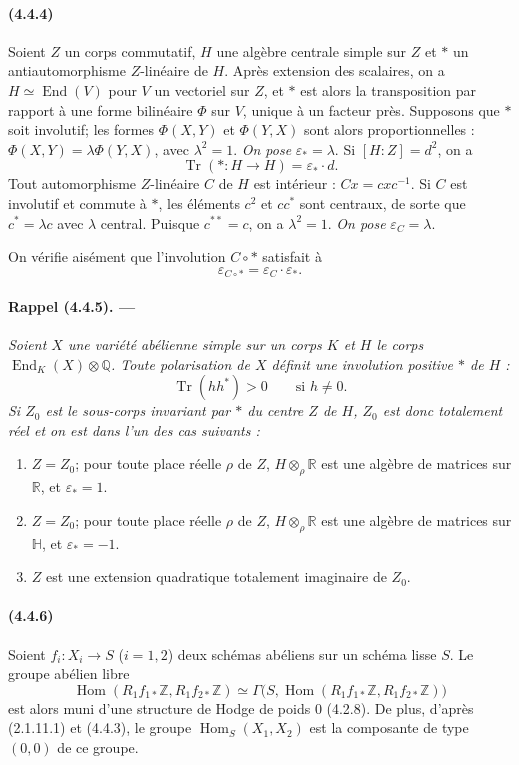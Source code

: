 \documentclass[10pt]{article}
\newcommand{\Q}{\mathbb Q}
\newcommand{\Z}{\mathbb Z}
\newcommand{\Hom}{\operatorname{Hom}}
\newcommand{\R}{\mathbb R}
\providecommand{\End}{\operatorname{End}}
\newcommand{\Tr}{\operatorname{Tr}}
\begin{document}
\paragraph{(4.4.4)} Soient $Z$ un corps commutatif, $H$ une algèbre centrale simple sur $Z$ et $*$ un antiautomorphisme $Z$-linéaire de $H$. Après extension des scalaires, on a $H\simeq\End(V)$ pour $V$ un vectoriel sur $Z$, et $*$ est alors la transposition par rapport à une forme bilinéaire $\Phi$ sur $V$, unique à un facteur près. Supposons que $*$ soit involutif; les formes $\Phi(X,Y)$ et $\Phi(Y,X)$ sont alors proportionnelles : $\Phi(X,Y)=\lambda\Phi(Y,X)$, avec $\lambda^2=1$. \emph{On pose} $\varepsilon_*=\lambda$. Si $[H:Z]=d^2$, on a
\[
\Tr(*:H\to H)=\varepsilon_*\cdot d.
\]
Tout automorphisme $Z$-linéaire $C$ de $H$ est intérieur : $Cx=cxc^{-1}$. Si $C$ est involutif et commute à $*$, les éléments $c^2$ et $cc^*$ sont centraux, de sorte que $c^*=\lambda c$ avec $\lambda$ central. Puisque $c^{**}=c$, on a $\lambda^2=1$. \emph{On pose} $\varepsilon_C=\lambda$.

On vérifie aisément que l'involution $C\circ *$ satisfait à
\[
\varepsilon_{C\circ *}=\varepsilon_C\cdot\varepsilon_*.
\]

\paragraph{Rappel (4.4.5). ---} {\itshape Soient $X$ une variété abélienne simple sur un corps $K$ et $H$ le corps $\End_K(X)\otimes\Q$. Toute polarisation de $X$ définit une involution positive $*$ de $H$ :
\[
\Tr(hh^*)>0\qquad\text{si }h\ne0.
\]
Si $Z_0$ est le sous-corps invariant par $*$ du centre $Z$ de $H$, $Z_0$ est donc totalement réel et on est dans l'un des cas suivants :
\begin{enumerate}[label=\alph*)]
\item $Z=Z_0$; pour toute place réelle $\rho$ de $Z$, $H\otimes_\rho\R$ est une algèbre de matrices sur $\R$, et $\varepsilon_*=1$.
\item $Z=Z_0$; pour toute place réelle $\rho$ de $Z$, $H\otimes_\rho\R$ est une algèbre de matrices sur $\mathbb H$, et $\varepsilon_*= -1$.
\item $Z$ est une extension quadratique totalement imaginaire de $Z_0$.
\end{enumerate}}

\paragraph{(4.4.6)} Soient $f_i:X_i\to S$ ($i=1,2$) deux schémas abéliens sur un schéma lisse $S$. Le groupe abélien libre
\[
\Hom(R_1f_{1*}\Z,R_1f_{2*}\Z)
 \simeq\Gamma\bigl(S,\Hom(R_1f_{1*}\Z,R_1f_{2*}\Z)\bigr)
\]
est alors muni d'une structure de Hodge de poids $0$ (4.2.8). De plus, d'après (2.1.11.1) et (4.4.3), le groupe $\Hom_S(X_1,X_2)$ est la composante de type $(0,0)$ de ce groupe.
\end{document}
